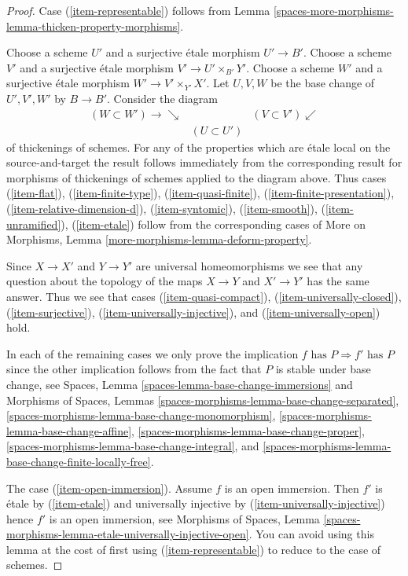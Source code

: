 \begin{proof}
Case (\ref{item-representable}) follows from
Lemma \ref{spaces-more-morphisms-lemma-thicken-property-morphisms}.

\medskip\noindent
Choose a scheme $U'$ and a surjective \'etale morphism $U' \to B'$.
Choose a scheme $V'$ and a surjective \'etale morphism
$V' \to U' \times_{B'} Y'$.
Choose a scheme $W'$ and a surjective \'etale morphism
$W' \to V' \times_{Y'} X'$. Let $U, V, W$ be the base change
of $U', V', W'$ by $B \to B'$. Consider the diagram
$$
\begin{array}{ccc}(W \subset W') \longrightarrow\searrow &  & (V \subset V') \swarrow \\  & (U \subset U') & \end{array}
$$
of thickenings of schemes. For any of the properties which are
\'etale local on the source-and-target the result follows immediately
from the corresponding result for morphisms of thickenings of schemes
applied to the diagram above. Thus cases
(\ref{item-flat}), (\ref{item-finite-type}),
(\ref{item-quasi-finite}), (\ref{item-finite-presentation}),
(\ref{item-relative-dimension-d}), (\ref{item-syntomic}),
(\ref{item-smooth}), (\ref{item-unramified}), (\ref{item-etale})
follow from the corresponding cases of
More on Morphisms, Lemma \ref{more-morphisms-lemma-deform-property}.

\medskip\noindent
Since $X \to X'$ and $Y \to Y'$ are universal homeomorphisms
we see that any question about the topology of the maps
$X \to Y$ and $X' \to Y'$ has the same answer. Thus we see
that cases (\ref{item-quasi-compact}), (\ref{item-universally-closed}),
(\ref{item-surjective}), (\ref{item-universally-injective}), and
(\ref{item-universally-open}) hold.

\medskip\noindent
In each of the remaining cases we only prove the implication
$f\text{ has }P \Rightarrow f'\text{ has }P$ since the other
implication follows from the fact that $P$ is stable under
base change, see
Spaces, Lemma \ref{spaces-lemma-base-change-immersions} and
Morphisms of Spaces, Lemmas
\ref{spaces-morphisms-lemma-base-change-separated},
\ref{spaces-morphisms-lemma-base-change-monomorphism},
\ref{spaces-morphisms-lemma-base-change-affine},
\ref{spaces-morphisms-lemma-base-change-proper},
\ref{spaces-morphisms-lemma-base-change-integral}, and
\ref{spaces-morphisms-lemma-base-change-finite-locally-free}.

\medskip\noindent
The case (\ref{item-open-immersion}). Assume $f$ is an open immersion.
Then $f'$ is \'etale by (\ref{item-etale}) and universally injective
by (\ref{item-universally-injective})
hence $f'$ is an open immersion, see
Morphisms of Spaces, Lemma
\ref{spaces-morphisms-lemma-etale-universally-injective-open}.
You can avoid using this lemma at the cost of first
using (\ref{item-representable}) to reduce to the case of schemes.


\end{proof}
